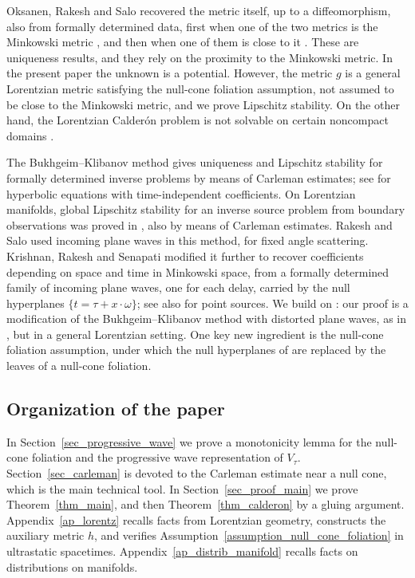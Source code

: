 \documentclass[12pt,reqno]{amsart}
\numberwithin{equation}{section}
\theoremstyle{definition}
\theoremstyle{plain}
\theoremstyle{definition}
\theoremstyle{definition}
\begin{document}
Oksanen, Rakesh and Salo recovered the metric itself, up to a diffeomorphism, also from formally determined data, first when one of the two metrics is the Minkowski metric \cite{oksanen2024rigiditylorentziancalderonproblem}, and then when one of them is close to it \cite{oksanen2026semiglobaluniquenesslorentziancalderon}. These are uniqueness results, and they rely on the proximity to the Minkowski metric. In the present paper the unknown is a potential. However, the metric $g$ is a general Lorentzian metric satisfying the null-cone foliation assumption, not assumed to be close to the Minkowski metric, and we prove Lipschitz stability. On the other hand, the Lorentzian Calder\'on problem is not solvable on certain noncompact domains \cite{oksanen2026counter}.

The Bukhgeim--Klibanov method \cite{bukhgeim1981global} gives uniqueness and Lipschitz stability for formally determined inverse problems by means of Carleman estimates; see \cite{imanuvilov2001,bellassoued2017book} for hyperbolic equations with time-independent coefficients. On Lorentzian manifolds, global Lipschitz stability for an inverse source problem from boundary observations was proved in \cite{takase2023}, also by means of Carleman estimates. Rakesh and Salo \cite{rakesh2020fixed,rakesh2020two} used incoming plane waves in this method, for fixed angle scattering. Krishnan, Rakesh and Senapati \cite{doi:10.1137/21M1400596} modified it further to recover coefficients depending on space and time in Minkowski space, from a formally determined family of incoming plane waves, one for each delay, carried by the null hyperplanes $\{t=\tau+x\cdot\omega\}$; see also \cite{krishnan2023point} for point sources. We build on \cite{doi:10.1137/21M1400596}: our proof is a modification of the Bukhgeim--Klibanov method with distorted plane waves, as in \cite{doi:10.1137/21M1400596}, but in a general Lorentzian setting. One key new ingredient is the null-cone foliation assumption, under which the null hyperplanes of \cite{doi:10.1137/21M1400596} are replaced by the leaves of a null-cone foliation.

\subsection{Organization of the paper}

In Section~\ref{sec_progressive_wave} we prove a monotonicity lemma for the null-cone foliation and the progressive wave representation of $V_\tau$. Section~\ref{sec_carleman} is devoted to the Carleman estimate near a null cone, which is the main technical tool. In Section~\ref{sec_proof_main} we prove Theorem~\ref{thm_main}, and then Theorem~\ref{thm_calderon} by a gluing argument. Appendix~\ref{ap_lorentz} recalls facts from Lorentzian geometry, constructs the auxiliary metric $h$, and verifies Assumption~\ref{assumption_null_cone_foliation} in ultrastatic spacetimes. Appendix~\ref{ap_distrib_manifold} recalls facts on distributions on manifolds.
\end{document}
